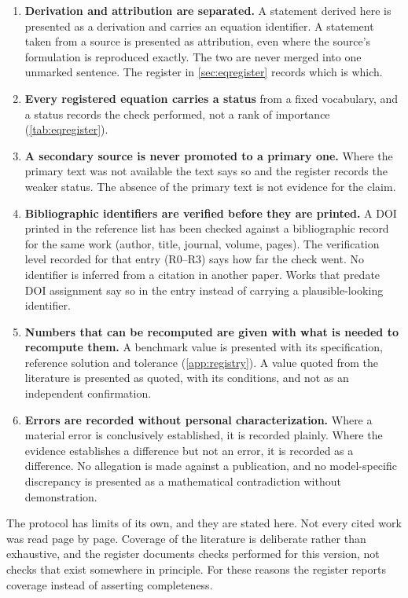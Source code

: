 \begin{enumerate}
\item \textbf{Derivation and attribution are separated.} A statement derived here is presented as a derivation and carries an equation identifier. A statement taken from a source is presented as attribution, even where the source's formulation is reproduced exactly. The two are never merged into one unmarked sentence. The register in \cref{sec:eqregister} records which is which.
\item \textbf{Every registered equation carries a status} from a fixed vocabulary, and a status records
the check performed, not a rank of importance (\cref{tab:eqregister}).
\item \textbf{A secondary source is never promoted to a primary one.} Where the primary text was not
available the text says so and the register records the weaker status. The absence of the primary text
is not evidence for the claim.
\item \textbf{Bibliographic identifiers are verified before they are printed.} A DOI printed in the reference list has been checked against a bibliographic record for the same work (author, title, journal, volume, pages). The verification level recorded for that entry (R0--R3) says how far the check went. No identifier is inferred from a citation in another paper. Works that predate DOI assignment say so in the entry instead of carrying a plausible-looking identifier.
\item \textbf{Numbers that can be recomputed are given with what is needed to recompute them.} A benchmark
value is presented with its specification, reference solution and tolerance
(\cref{app:registry}). A value quoted from the literature is presented as quoted, with its conditions,
and not as an independent confirmation.
\item \textbf{Errors are recorded without personal characterization.} Where a material error is conclusively established, it is recorded plainly. Where the evidence establishes a difference but not an error, it is recorded as a difference. No allegation is made against a publication, and no model-specific discrepancy is presented as a mathematical contradiction without demonstration.
\end{enumerate}

The protocol has limits of its own, and they are stated here. Not every cited work was read page by page. Coverage of
the literature is deliberate rather than exhaustive, and the register documents checks performed for this
version, not checks that exist somewhere in principle. For these reasons the register reports coverage
instead of asserting completeness.

